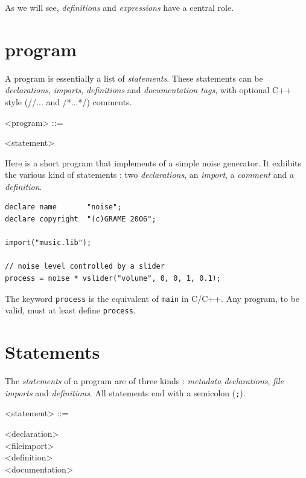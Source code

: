 \documentclass[a4paper]{book}
\begin{document}
As we will see, \textit{definitions} and \textit{expressions} have a central role.

\section{\faust program}

A \faust program is essentially a list of \textit{statements}. These statements can be \textit{declarations}, \textit{imports}, \textit{definitions} and \textit{documentation tags}, with optional C++ style (//... and /*...*/) comments.
 
\begin{grammar}
  <program> ::= 
  \begin{syntdiag}
    \begin{rep}
      <statement>
    \end{rep}
  \end{syntdiag}
\end{grammar}

Here is a short \faust program that implements of a simple noise generator. It exhibits the various kind of statements : two \textit{declarations}, an \textit{import}, a \textit{comment} and a \textit{definition}.

\begin{lstlisting}
declare name       "noise";
declare copyright  "(c)GRAME 2006";

import("music.lib");

// noise level controlled by a slider
process = noise * vslider("volume", 0, 0, 1, 0.1);
\end{lstlisting}
 
The keyword \lstinline'process' is the equivalent of \lstinline'main' in C/C++. Any \faust program, to be valid, must at least define \lstinline'process'.


\section{Statements}

The \textit{statements} of a \faust program are of three kinds : \textit{metadata declarations}, \textit{file imports} and \textit{definitions}. All statements end with a semicolon (\lstinline';'). 

\begin{grammar}
  <statement> ::= 
  \begin{syntdiag}
    \begin{stack}
      <declaration>\\
      <fileimport>\\
      <definition>\\
      <documentation>
    \end{stack}
  \end{syntdiag}
\end{grammar}
\end{document}
